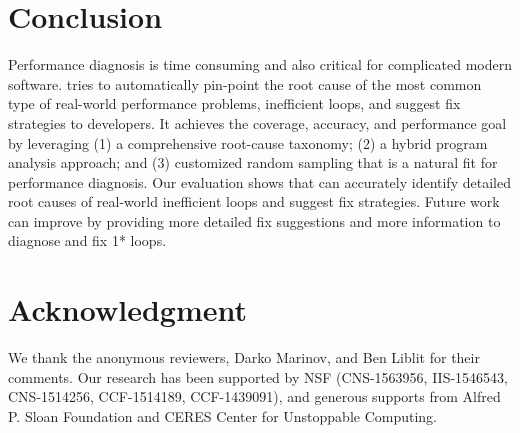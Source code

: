 \section{Conclusion}
\label{sec:con}
Performance diagnosis is time consuming and also critical for 
complicated modern software. \Tool tries to automatically 
pin-point the root cause of
the most common type of real-world performance problems, inefficient loops,
and suggest fix strategies to developers. It achieves the 
coverage, accuracy, and performance goal by leveraging
(1) a comprehensive root-cause taxonomy; (2) a hybrid program
analysis approach; and (3) customized random sampling that is a natural fit for 
performance diagnosis.
Our evaluation shows that \Tool can accurately identify detailed root causes
of real-world inefficient loops and suggest fix strategies.
Future work can improve \Tool by providing more detailed fix
suggestions and more information to diagnose and fix
1* loops.


\section*{Acknowledgment}
We thank the anonymous reviewers, Darko Marinov, and Ben Liblit for their comments.
Our research has been supported by NSF (CNS-1563956, IIS-1546543, CNS-1514256, CCF-1514189, CCF-1439091), 
and generous supports from Alfred P. Sloan Foundation and CERES Center for Unstoppable Computing.

